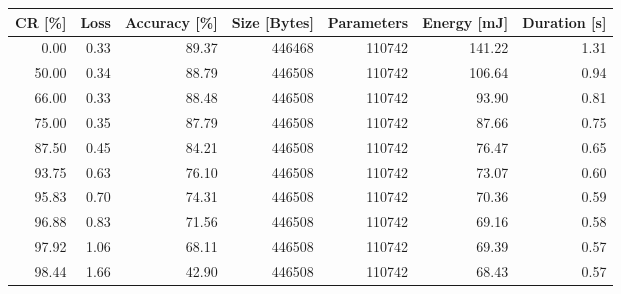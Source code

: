 \begin{tabular}{rrrrrrr}
\toprule
    CR [\%] &       Loss & Accuracy [\%] & Size [Bytes] & Parameters & Energy [mJ] & Duration [s] \\
\midrule
      0.00 &       0.33 &        89.37 &       446468 &     110742 &      141.22 &         1.31 \\
     50.00 &       0.34 &        88.79 &       446508 &     110742 &      106.64 &         0.94 \\
     66.00 &       0.33 &        88.48 &       446508 &     110742 &       93.90 &         0.81 \\
     75.00 &       0.35 &        87.79 &       446508 &     110742 &       87.66 &         0.75 \\
     87.50 &       0.45 &        84.21 &       446508 &     110742 &       76.47 &         0.65 \\
     93.75 &       0.63 &        76.10 &       446508 &     110742 &       73.07 &         0.60 \\
     95.83 &       0.70 &        74.31 &       446508 &     110742 &       70.36 &         0.59 \\
     96.88 &       0.83 &        71.56 &       446508 &     110742 &       69.16 &         0.58 \\
     97.92 &       1.06 &        68.11 &       446508 &     110742 &       69.39 &         0.57 \\
     98.44 &       1.66 &        42.90 &       446508 &     110742 &       68.43 &         0.57 \\
\bottomrule
\end{tabular}
